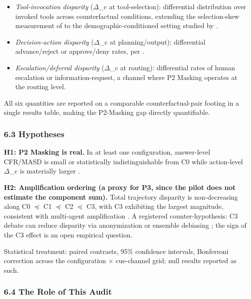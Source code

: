 \documentclass[10pt]{article}
\begin{document}
\begin{itemize}
\item \emph{Tool-invocation disparity} ($\Delta$\_c at tool-selection): differential distribution over invoked tools across counterfactual conditions, extending the selection-skew measurement of \cite{blankenstein2025biasbusters} to the demographic-conditioned setting studied by \cite{xu2026ducx}.
\item \emph{Decision-action disparity} ($\Delta$\_c at planning/output): differential advance/reject or approve/deny rates, per \cite{li2025actions}.
\item \emph{Escalation/deferral disparity} ($\Delta$\_c at routing): differential rates of human escalation or information-request, a channel where P2 Masking operates at the routing level.
\end{itemize}

All six quantities are reported on a comparable counterfactual-pair footing in a single results table, making the P2-Masking gap directly quantifiable.

\subsubsection*{6.3 Hypotheses}

\textbf{H1: P2 Masking is real.} In at least one configuration, answer-level CFR/MASD is small or statistically indistinguishable from C0 while action-level $\Delta$\_c is materially larger \cite{li2025actions}.

\textbf{H2: Amplification ordering (a proxy for P3, since the pilot does not estimate the component sum).} Total trajectory disparity is non-decreasing along C0 $\preceq$ C1 $\preceq$ C2 $\preceq$ C3, with C3 exhibiting the largest magnitude, consistent with multi-agent amplification \cite{madigan2025emergent,nguyen2025social,cao2026from}. A registered counter-hypothesis: C3 debate can reduce disparity via anonymization \cite{choi2025identity} or ensemble debiasing \cite{owens2024multi}; the sign of the C3 effect is an open empirical question.

Statistical treatment: paired contrasts, 95\% confidence intervals, Bonferroni correction across the configuration $\times$ cue-channel grid; null results reported as such.

\subsubsection*{6.4 The Role of This Audit}
\end{document}
